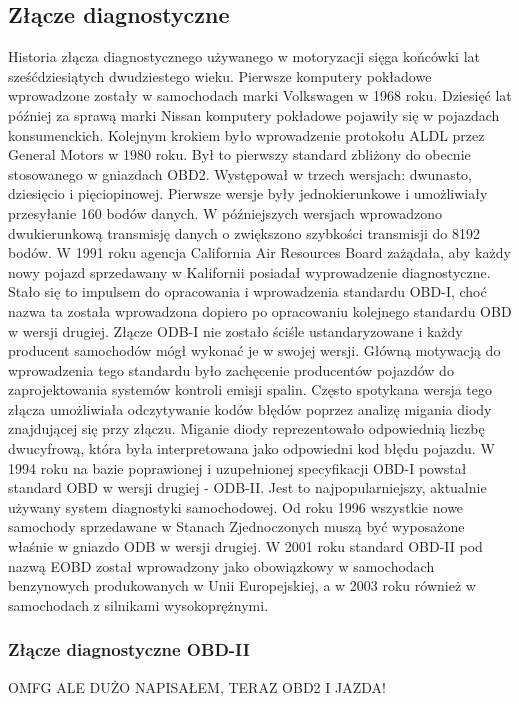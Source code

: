 \documentclass[12pt]{article} %
\numberwithin{equation}{subsection}
\numberwithin{figure}{section}
\numberwithin{table}{section}
\begin{document}
	\subsection{Złącze diagnostyczne}
		\hspace{0.5cm}Historia złącza diagnostycznego używanego w motoryzacji sięga końcówki lat sześćdziesiątych dwudziestego wieku. Pierwsze komputery pokładowe wprowadzone zostały w samochodach marki Volkswagen w 1968 roku. Dziesięć lat później za sprawą marki Nissan komputery pokładowe pojawiły się w pojazdach konsumenckich. Kolejnym krokiem było wprowadzenie protokołu ALDL  przez General Motors w 1980 roku. Był to pierwszy standard zbliżony do obecnie stosowanego w gniazdach OBD2. Występował w trzech wersjach: dwunasto, dziesięcio i pięciopinowej. Pierwsze wersje były jednokierunkowe i umożliwiały przesyłanie 160 bodów danych. W późniejszych wersjach wprowadzono dwukierunkową transmisję danych o zwiększono szybkości transmisji do 8192 bodów. W 1991 roku agencja California Air Resources Board zażądała, aby każdy nowy pojazd sprzedawany w Kalifornii posiadał wyprowadzenie diagnostyczne. Stało się to impulsem do opracowania i wprowadzenia standardu OBD-I, choć nazwa ta została wprowadzona dopiero po opracowaniu kolejnego standardu OBD w wersji drugiej. Złącze ODB-I nie zostało ściśle ustandaryzowane i każdy producent samochodów mógł wykonać je w swojej wersji. Główną motywacją do wprowadzenia tego standardu było zachęcenie producentów pojazdów do zaprojektowania systemów kontroli emisji spalin. Często spotykana wersja tego złącza umożliwiała odczytywanie kodów błędów poprzez analizę migania diody znajdującej się przy złączu. Miganie diody reprezentowało odpowiednią liczbę dwucyfrową, która była interpretowana jako odpowiedni kod błędu pojazdu. W 1994 roku na bazie poprawionej i uzupełnionej specyfikacji OBD-I powstał standard OBD w wersji drugiej - ODB-II. Jest to najpopularniejszy, aktualnie używany system diagnostyki samochodowej. Od roku 1996 wszystkie nowe samochody sprzedawane w Stanach Zjednoczonych muszą być wyposażone właśnie w gniazdo ODB w wersji drugiej. W 2001 roku standard OBD-II pod nazwą EOBD został wprowadzony jako obowiązkowy w samochodach benzynowych produkowanych w Unii Europejskiej, a w 2003 roku również w samochodach z silnikami wysokoprężnymi.
		
		\newpage
		
		\subsubsection{Złącze diagnostyczne OBD-II}
			\hspace{0.5cm}OMFG ALE DUŻO NAPISAŁEM, TERAZ OBD2 I JAZDA!
		
\end{document}
